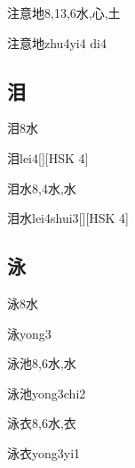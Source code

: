 \begin{Entry}{注意地}{8,13,6}{⽔,⼼,⼟}
  \begin{Phonetics}{注意地}{zhu4yi4 di4}
  \end{Phonetics}
\end{Entry}

\subsection*{泪}

\begin{Entry}{泪}{8}{⽔}
  \begin{Phonetics}{泪}{lei4}[][HSK 4]
  \end{Phonetics}
\end{Entry}

\begin{Entry}{泪水}{8,4}{⽔,⽔}
  \begin{Phonetics}{泪水}{lei4shui3}[][HSK 4]
  \end{Phonetics}
\end{Entry}

\subsection*{泳}

\begin{Entry}{泳}{8}{⽔}
  \begin{Phonetics}{泳}{yong3}
  \end{Phonetics}
\end{Entry}

\begin{Entry}{泳池}{8,6}{⽔,⽔}
  \begin{Phonetics}{泳池}{yong3chi2}
  \end{Phonetics}
\end{Entry}

\begin{Entry}{泳衣}{8,6}{⽔,⾐}
  \begin{Phonetics}{泳衣}{yong3yi1}
  \end{Phonetics}
\end{Entry}

